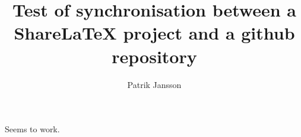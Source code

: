 \documentclass{article}
\author{Patrik Jansson}
\title{Test of synchronisation between a ShareLaTeX project and a github repository}
\begin{document}
\maketitle
Seems to work.
\end{document}
